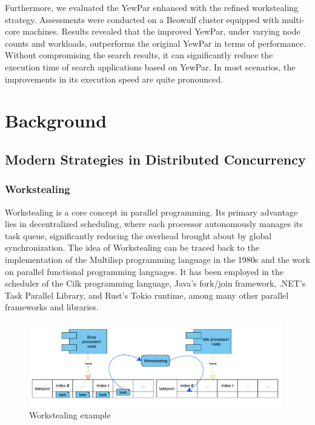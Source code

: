 \documentclass{mproj}
\begin{document}
Furthermore, we evaluated the YewPar enhanced with the refined workstealing strategy.
Assessments were conducted on a Beowulf cluster equipped with multi-core machines.
Results revealed that the improved YewPar, under varying node counts and workloads, outperforms the original YewPar in terms of performance.
Without compromising the search results, it can significantly reduce the execution time of search applications based on YewPar.
In most scenarios, the improvements in its execution speed are quite pronounced.

\chapter{Background}\label{survey}

\section{Modern Strategies in Distributed Concurrency}
\subsection{Workstealing}

Workstealing is a core concept in parallel programming.
Its primary advantage lies in decentralized scheduling,
where each processor autonomously manages its task queue,
significantly reducing the overhead brought about by global synchronization.
The idea of Workstealing can be traced back to the implementation of the Multilisp programming language in the 1980s and the work on parallel functional programming languages\cite{10.1145/324133.324234}.
It has been employed in the scheduler of the Cilk programming language\cite{BLUMOFE199655},
Java's fork/join framework\cite{lea2000forkjoin},
.NET's Task Parallel Library\cite{leijen2009design},
and Rust's Tokio runtime\cite{tokio,krill2021tokio},
among many other parallel frameworks and libraries.

\begin{figure}[h]
    \centering
    \includegraphics[width=0.98\textwidth]{images/workstealing.pdf}
    \caption{Workstealing example}
    \label{fig:workstealing}
\end{figure}
\FloatBarrier
\end{document}
